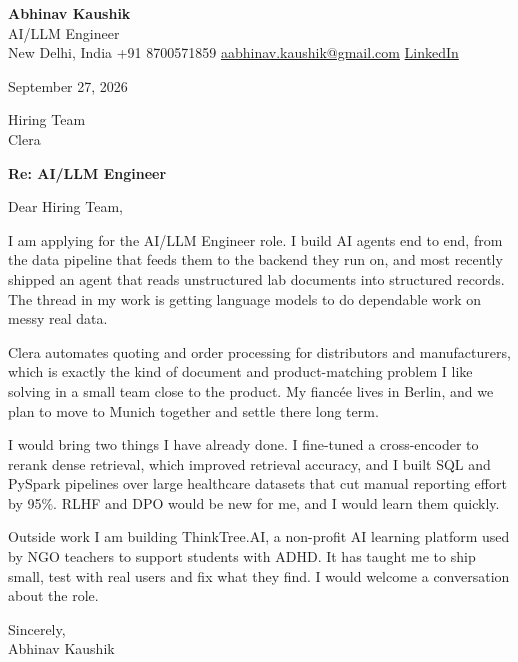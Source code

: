 \documentclass[11pt,a4paper]{article}
\begin{document}
{\Large\bfseries Abhinav Kaushik}\\
AI/LLM Engineer\\
New Delhi, India \textbar{} +91 8700571859 \textbar{} \href{mailto:aabhinav.kaushik@gmail.com}{aabhinav.kaushik@gmail.com} \textbar{} \href{https://www.linkedin.com/in/abhinav-kaushik10/}{LinkedIn}  

September 27, 2026

Hiring Team\\
Clera

\textbf{Re: AI/LLM Engineer}

Dear Hiring Team,

I am applying for the AI/LLM Engineer role. I build AI agents end to end, from the data pipeline that feeds them to the backend they run on, and most recently shipped an agent that reads unstructured lab documents into structured records. The thread in my work is getting language models to do dependable work on messy real data.

Clera automates quoting and order processing for distributors and manufacturers, which is exactly the kind of document and product-matching problem I like solving in a small team close to the product. My fiancée lives in Berlin, and we plan to move to Munich together and settle there long term.

I would bring two things I have already done. I fine-tuned a cross-encoder to rerank dense retrieval, which improved retrieval accuracy, and I built SQL and PySpark pipelines over large healthcare datasets that cut manual reporting effort by 95\%. RLHF and DPO would be new for me, and I would learn them quickly.

Outside work I am building ThinkTree.AI, a non-profit AI learning platform used by NGO teachers to support students with ADHD. It has taught me to ship small, test with real users and fix what they find. I would welcome a conversation about the role.

Sincerely,\\[4pt]
Abhinav Kaushik
\end{document}

